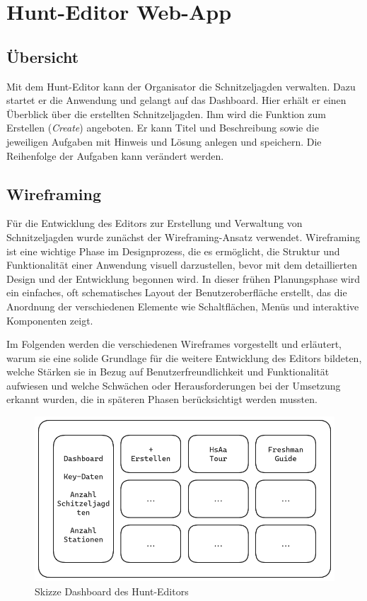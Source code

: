 \section{Hunt-Editor Web-App}

\subsection{Übersicht}

Mit dem Hunt-Editor kann der Organisator die Schnitzeljagden verwalten. Dazu startet er die Anwendung und gelangt auf das Dashboard. Hier erhält er einen Überblick über die erstellten Schnitzeljagden. Ihm wird die Funktion zum Erstellen (\textit{Create}) angeboten. Er kann Titel und Beschreibung sowie die jeweiligen Aufgaben mit Hinweis und Lösung anlegen und speichern. Die Reihenfolge der Aufgaben kann verändert werden.
\subsection{Wireframing}

Für die Entwicklung des Editors zur Erstellung und Verwaltung von Schnitzeljagden wurde zunächst der Wireframing-Ansatz verwendet. Wireframing ist eine wichtige Phase im Designprozess, die es ermöglicht, die Struktur und Funktionalität einer Anwendung visuell darzustellen, bevor mit dem detaillierten Design und der Entwicklung begonnen wird. In dieser frühen Planungsphase wird ein einfaches, oft schematisches Layout der Benutzeroberfläche erstellt, das die Anordnung der verschiedenen Elemente wie Schaltflächen, Menüs und interaktive Komponenten zeigt.

Im Folgenden werden die verschiedenen Wireframes vorgestellt und erläutert, warum sie eine solide Grundlage für die weitere Entwicklung des Editors bildeten, welche Stärken sie in Bezug auf Benutzerfreundlichkeit und Funktionalität aufwiesen und welche Schwächen oder Herausforderungen bei der Umsetzung erkannt wurden, die in späteren Phasen berücksichtigt werden mussten.

\begin{figure}[H]
  \centering
  \includegraphics[width=1\textwidth]{images/wireframing/PrAr_Scavhunt_Wireframing-2.1.png}
  \caption{Skizze Dashboard des Hunt-Editors}
  \label{fig:wireframing-frontend-hunt-editor-3}
\end{figure}

